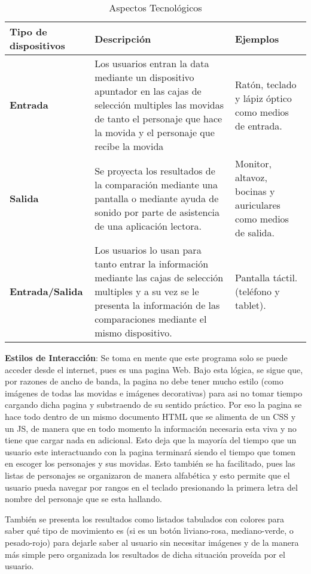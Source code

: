 \begin{table}
    \caption{Aspectos Tecnológicos}
    
\begin{tabularx}{\textwidth}{| X | X | X |}
    \hline
    \textbf{Tipo de dispositivos} & \textbf{Descripción} & \textbf{Ejemplos} \\
    \hline
    \textbf{Entrada} & Los usuarios entran la data mediante un dispositivo apuntador en las cajas de selección multiples las movidas de tanto el personaje que hace la movida y el personaje que recibe la movida & Ratón, teclado y lápiz óptico como medios de entrada. \\
    \hline
    \textbf{Salida} & Se proyecta los resultados de la comparación mediante una pantalla o mediante ayuda de sonido por parte de asistencia de una aplicación lectora. & Monitor, altavoz, bocinas y auriculares como medios de salida. \\
    \hline
    \textbf{Entrada/Salida} & Los usuarios lo usan para tanto entrar la información mediante las cajas de selección multiples y a su vez se le presenta la información de las comparaciones mediante el mismo dispositivo. & Pantalla táctil. (teléfono y tablet). \\
    \hline
\end{tabularx}

\label{tab: aspectos tec}
\end{table}

\textbf{Estilos de Interacción}: Se toma en mente que este programa solo se puede acceder desde el internet, pues es una pagina Web. Bajo esta lógica, se sigue que, por razones de ancho de banda, la pagina no debe tener mucho estilo (como imágenes de todas las movidas e imágenes decorativas) para asi no tomar tiempo cargando dicha pagina y substraendo de su sentido práctico. Por eso la pagina se hace todo dentro de un mismo documento HTML que se alimenta de un CSS y un JS, de manera que en todo momento la información necesaria esta viva y no tiene que cargar nada en adicional. Esto deja que la mayoría del tiempo que un usuario este interactuando con la pagina terminará siendo el tiempo que tomen en escoger los personajes y sus movidas. Esto también se ha facilitado, pues las listas de personajes se organizaron de manera alfabética y esto permite que el usuario pueda navegar por rangos en el teclado presionando la primera letra del nombre del personaje que se esta hallando. 

También se presenta los resultados como listados tabulados con colores para saber qué tipo de movimiento es (si es un botón liviano-rosa, mediano-verde, o pesado-rojo) para dejarle saber al usuario sin necesitar imágenes y de la manera más simple pero organizada los resultados de dicha situación proveída por el usuario.

